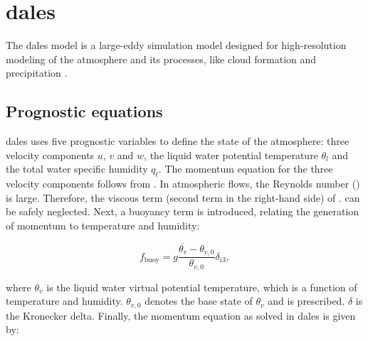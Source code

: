 \section{\acrshort{dales}}
The \acrfull{dales} model is a large-eddy simulation model designed for high-resolution modeling of the atmosphere and its processes, like cloud formation and precipitation \citep{heusFormulationDutchAtmospheric2010,ouwerslootLargeEddySimulationComparison2017}. 

\subsection{Prognostic equations}
\acrshort{dales} uses five prognostic variables to define the state of the atmosphere: three velocity components $u$, $v$ and $w$, the liquid water potential temperature $\theta_l$ and the total water specific humidity $q_t$. The momentum equation for the three velocity components follows from . In atmospheric flows, the Reynolds number () is large. Therefore, the viscous term (second term in the right-hand side) of . can be safely neglected. Next, a buoyancy term is introduced, relating the generation of momentum to temperature and humidity:

\begin{equation}
    f_{\text{buoy}} = g \frac{\overline{\theta_v} - \theta_{v,0}}{\theta_{v,0}} \delta_{i3},
\end{equation}

where $\theta_v$ is the liquid water virtual potential temperature, which is a function of temperature and humidity. $\theta_{v,0}$ denotes the base state of $\theta_v$ and is prescribed. $\delta$ is the Kronecker delta. Finally, the momentum equation as solved in \acrshort{dales} is given by:



